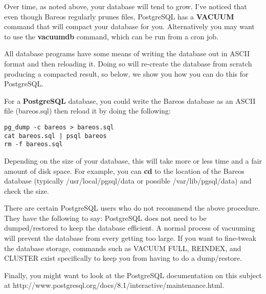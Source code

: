 Over time, as noted above, your database will tend to grow. I've noticed that
even though Bareos regularly prunes files, PostgreSQL has a {\bf VACUUM}
command that will compact your database for you. Alternatively you may want to
use the {\bf vacuumdb} command, which can be run from a cron job.

All database programs have some means of writing the database out in ASCII
format and then reloading it. Doing so will re-create the database from
scratch producing a compacted result, so below, we show you how you can do
this for PostgreSQL.

For a {\bf PostgreSQL} database, you could write the Bareos database as an
ASCII file (bareos.sql) then reload it by doing the following:

\footnotesize
\begin{verbatim}
pg_dump -c bareos > bareos.sql
cat bareos.sql | psql bareos
rm -f bareos.sql
\end{verbatim}
\normalsize

Depending on the size of your database, this will take more or less time and a
fair amount of disk space. For example, you can {\bf cd} to the location of
the Bareos database (typically /usr/local/pgsql/data or possible
/var/lib/pgsql/data) and check the size.

There are certain PostgreSQL users who do not recommend the above
procedure. They have the following to say:
PostgreSQL does not
need to be dumped/restored to keep the database efficient.  A normal
process of vacuuming will prevent the database from every getting too
large.  If you want to fine-tweak the database storage, commands such
as VACUUM FULL, REINDEX, and CLUSTER exist specifically to keep you
from having to do a dump/restore.

Finally, you might want to look at the PostgreSQL documentation on
this subject at
{http://www.postgresql.org/docs/8.1/interactive/maintenance.html}.



